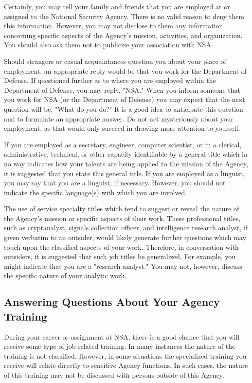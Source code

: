 \documentclass[a4]{article}
\begin{document}
Certainly, you may tell your family and friends that you are employed at or
assigned to the National Security Agency.  There is no valid reason to deny
them this information.  However, you may not disclose to them any information
concerning specific aspects of the Agency's mission, activities, and
organization.  You should also ask them not to publicize your association with
NSA.

Should strangers or casual acquaintances question you about your place of
employment, an appropriate reply would be that you work for the Department of
Defense.  If questioned further as to where you are employed within the
Department of Defense, you may reply, "NSA."  When you inform someone that you
work for NSA (or the Department of Defense) you may expect that the next
question will be, "What do you do?"  It is a good idea to anticipate this
question and to formulate an appropriate answer.  Do not act mysteriously about
your employment, as that would only succeed in drawing more attention to
yourself.

If you are employed as a secretary, engineer, computer scientist, or in a
clerical, administrative, technical, or other capacity identifiable by a
general title which in no way indicates how your talents are being applied to
the mission of the Agency, it is suggested that you state this general title.
If you are employed as a linguist, you may say that you are a linguist, if
necessary.  However, you should not indicate the specific language(s) with
which you are involved.

The use of service specialty titles which tend to suggest or reveal the nature
of the Agency's mission or specific aspects of their work.  These professional
titles, such as cryptanalyst, signals collection officer, and intelligence
research analyst, if given verbatim to an outsider, would likely generate
further questions which may touch upon the classified aspects of your work.
Therefore, in conversation with outsiders, it is suggested that such job
titles be generalized.  For example, you might indicate that you are a
"research analyst."  You may not, however, discuss the specific nature of your
analytic work.

\subsection{Answering Questions About Your Agency Training}

During your career or assignment at NSA, there is a good chance that you will
receive some type of job-related training.  In many instances the nature of the
training is not classified.  However, in some situations the specialized
training you receive will relate directly to sensitive Agency functions.  In
such cases, the nature of this training may not be discussed with persons
outside of this Agency.
\end{document}
